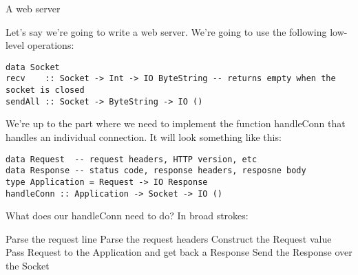 A web server

Let's say we're going to write a web server. We're going to use the following low-level
operations:
\begin{lstlisting}
data Socket
recv    :: Socket -> Int -> IO ByteString -- returns empty when the socket is closed
sendAll :: Socket -> ByteString -> IO ()
\end{lstlisting}
We're up to the part where we need to implement the function handleConn that
handles an individual connection. It will look something like this:
\begin{lstlisting}
data Request  -- request headers, HTTP version, etc
data Response -- status code, response headers, resposne body
type Application = Request -> IO Response
handleConn :: Application -> Socket -> IO ()
\end{lstlisting}
What does our handleConn need to do? In broad strokes:

  
   Parse the request line
   Parse the request headers
   Construct the Request value
   Pass Request to the Application and get back a Response
   Send the Response over the Socket
  
